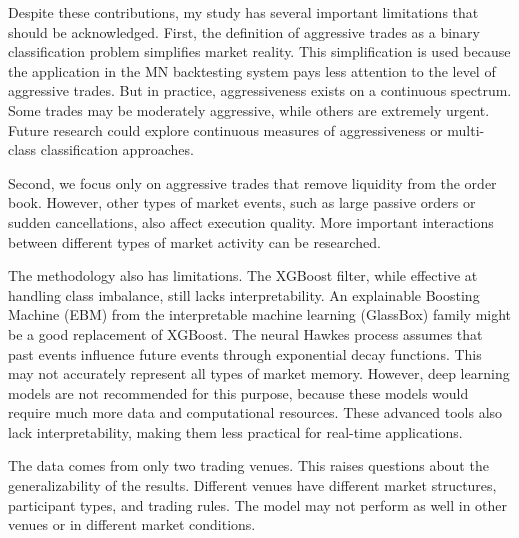Despite these contributions, my study has several important limitations that should be acknowledged.
First, the definition of aggressive trades as a binary classification problem simplifies market reality. This simplification is used because the application in the MN backtesting system pays less attention to the level of aggressive trades. But in practice, aggressiveness exists on a continuous spectrum. Some trades may be moderately aggressive, while others are extremely urgent. Future research could explore continuous measures of aggressiveness or multi-class classification approaches.

Second, we focus only on aggressive trades that remove liquidity from the order book. However, other types of market events, such as large passive orders or sudden cancellations, also affect execution quality. More important interactions between different types of market activity can be researched.

The methodology also has limitations. The XGBoost filter, while effective at handling class imbalance, still lacks interpretability. An explainable Boosting Machine (EBM) from the interpretable machine learning (GlassBox) family might be a good replacement of XGBoost. 
The neural Hawkes process assumes that past events influence future events through exponential decay functions. This may not accurately represent all types of market memory. However, deep learning models are not recommended for this purpose, because these models would require much more data and computational resources. These advanced tools also lack interpretability, making them less practical for real-time applications.

The data comes from only two trading venues. This raises questions about the generalizability of the results. Different venues have different market structures, participant types, and trading rules. The model may not perform as well in other venues or in different market conditions.


